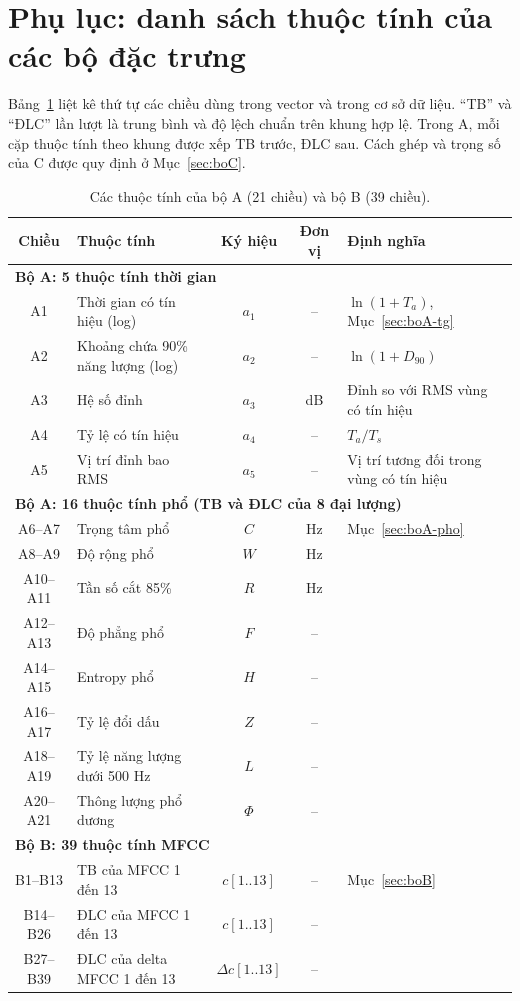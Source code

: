 \documentclass[11pt,a4paper]{article}
\begin{document}
\section*{Phụ lục: danh sách thuộc tính của các bộ đặc trưng}
Bảng~\ref{tab:thuoctinh} liệt kê thứ tự các chiều dùng trong vector và trong cơ sở dữ liệu. ``TB'' và ``ĐLC'' lần lượt là trung bình và độ lệch chuẩn trên khung hợp lệ. Trong A, mỗi cặp thuộc tính theo khung được xếp TB trước, ĐLC sau. Cách ghép và trọng số của C được quy định ở Mục~\ref{sec:boC}.
\begin{table}[htbp]
\centering\small
\caption{Các thuộc tính của bộ A (21 chiều) và bộ B (39 chiều).}\label{tab:thuoctinh}
\begin{tabularx}{\textwidth}{clccX}
\toprule
Chiều & Thuộc tính & Ký hiệu & Đơn vị & Định nghĩa\\\midrule
\multicolumn{5}{l}{\textbf{Bộ A: 5 thuộc tính thời gian}}\\
A1 & Thời gian có tín hiệu (log) & $a_1$ & -- & $\ln(1+T_a)$, Mục~\ref{sec:boA-tg}\\
A2 & Khoảng chứa 90\% năng lượng (log) & $a_2$ & -- & $\ln(1+D_{90})$\\
A3 & Hệ số đỉnh & $a_3$ & dB & Đỉnh so với RMS vùng có tín hiệu\\
A4 & Tỷ lệ có tín hiệu & $a_4$ & -- & $T_a/T_s$\\
A5 & Vị trí đỉnh bao RMS & $a_5$ & -- & Vị trí tương đối trong vùng có tín hiệu\\\midrule
\multicolumn{5}{l}{\textbf{Bộ A: 16 thuộc tính phổ (TB và ĐLC của 8 đại lượng)}}\\
A6--A7 & Trọng tâm phổ & $C$ & Hz & Mục~\ref{sec:boA-pho}\\
A8--A9 & Độ rộng phổ & $W$ & Hz & \\
A10--A11 & Tần số cắt 85\% & $R$ & Hz & \\
A12--A13 & Độ phẳng phổ & $F$ & -- & \\
A14--A15 & Entropy phổ & $H$ & -- & \\
A16--A17 & Tỷ lệ đổi dấu & $Z$ & -- & \\
A18--A19 & Tỷ lệ năng lượng dưới 500 Hz & $L$ & -- & \\
A20--A21 & Thông lượng phổ dương & $\Phi$ & -- & \\\midrule
\multicolumn{5}{l}{\textbf{Bộ B: 39 thuộc tính MFCC}}\\
B1--B13 & TB của MFCC 1 đến 13 & $c[1..13]$ & -- & Mục~\ref{sec:boB}\\
B14--B26 & ĐLC của MFCC 1 đến 13 & $c[1..13]$ & -- & \\
B27--B39 & ĐLC của delta MFCC 1 đến 13 & $\Delta c[1..13]$ & -- & \\\bottomrule
\end{tabularx}
\end{table}
\clearpage
\end{document}
